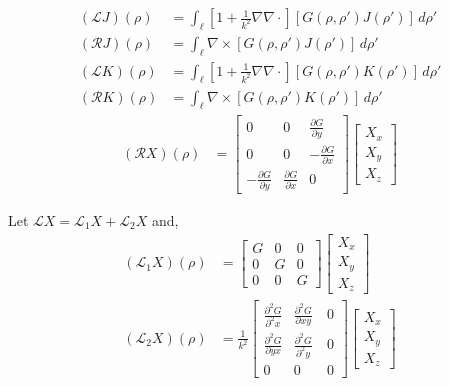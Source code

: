 \documentclass{article}
\newcommand{\0}{\varnothing}
\begin{document}
\begin{align*}
    (\mathcal{L}J)(\rho) &= \int_{\ell}[1+\frac{1}{k^2}\nabla\nabla\cdotp] [G(\rho,\rho')J(\rho')] \,d\rho'\\
    (\mathcal{R}J)(\rho) &= \int_{\ell}\nabla \times [G(\rho,\rho')J(\rho')] \,d\rho'\\
    (\mathcal{L}K)(\rho) &= \int_{\ell}[1+\frac{1}{k^2}\nabla\nabla\cdotp] [G(\rho,\rho')K(\rho')] \,d\rho'\\
    (\mathcal{R}K)(\rho) &= \int_{\ell}\nabla \times [G(\rho,\rho')K(\rho')] \,d\rho'
\end{align*}
\begin{align*}
    (\mathcal{R}X)(\rho)
       &= \left[ \begin{array}{ccc} 0 & 0 & \frac{\partial G}{\partial y}\\ 
                            0 & 0 &-\frac{\partial G}{\partial x}\\ 
                            -\frac{\partial G}{\partial y} &\frac{\partial G}{\partial x} &0 \end{array} \right]
        \left[ \begin{array}{c} 
        X_x \\ X_y \\ X_z \end{array} \right]
\end{align*}

Let $\mathcal{L}X = \mathcal{L}_1 X + \mathcal{L}_2 X$ and,
\begin{align*}
    (\mathcal{L}_1 X)(\rho) &= 
    \left[ \begin{array}{ccc} G & 0 & 0 \\ 
                            0 & G & 0\\ 
                            0 & 0 & G \end{array} \right]
        \left[ \begin{array}{c} 
        X_x \\ X_y \\ X_z \end{array} \right]\\
    (\mathcal{L}_2X)(\rho)
    &= \frac{1}{k^2} \left[ \begin{array}{ccc} \frac{\partial^2 G }{\partial^2 x} & \frac{\partial^2 G }{\partial xy}\ & 0 \\ 
                            \frac{\partial^2 G}{\partial yx} & \frac{\partial^2 G}{\partial^2 y} &0\\ 
                            0 & 0 &0 \end{array} \right]
        \left[ \begin{array}{c} 
        X_x \\ X_y \\ X_z \end{array} \right]
\end{align*}
\end{document}
